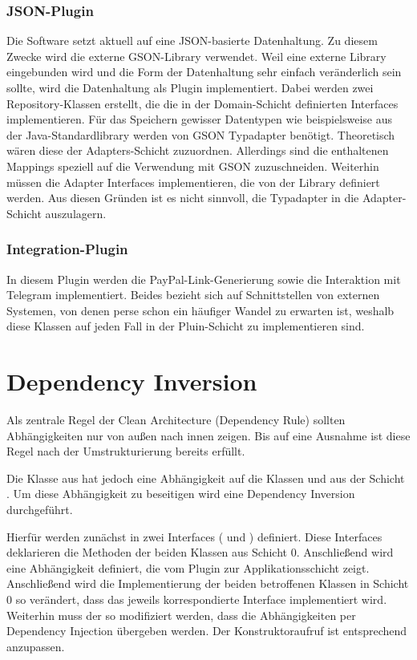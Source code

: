 \subsubsection{JSON-Plugin}
Die Software setzt aktuell auf eine JSON-basierte Datenhaltung.
Zu diesem Zwecke wird die externe GSON-Library verwendet.
Weil eine externe Library eingebunden wird und die Form der Datenhaltung sehr einfach veränderlich sein sollte, wird die Datenhaltung als Plugin implementiert.
Dabei werden zwei Repository-Klassen erstellt, die die in der Domain-Schicht definierten Interfaces implementieren.
Für das Speichern gewisser Datentypen wie beispielsweise  aus der Java-Standardlibrary werden von GSON Typadapter benötigt.
Theoretisch wären diese der Adapters-Schicht zuzuordnen.
Allerdings sind die enthaltenen Mappings speziell auf die Verwendung mit GSON zuzuschneiden.
Weiterhin müssen die Adapter Interfaces implementieren, die von der Library definiert werden.
Aus diesen Gründen ist es nicht sinnvoll, die Typadapter in die Adapter-Schicht auszulagern.

\subsubsection{Integration-Plugin}
In diesem Plugin werden die PayPal-Link-Generierung sowie die Interaktion mit Telegram implementiert.
Beides bezieht sich auf Schnittstellen von externen Systemen, von denen perse schon ein häufiger Wandel zu erwarten ist, weshalb diese Klassen auf jeden Fall in der Pluin-Schicht zu implementieren sind.

\section{Dependency Inversion}
Als zentrale Regel der Clean Architecture (Dependency Rule) sollten Abhängigkeiten nur von außen nach innen zeigen.
Bis auf eine Ausnahme ist diese Regel nach der Umstrukturierung bereits erfüllt.

Die Klasse  aus  hat jedoch eine Abhängigkeit auf die Klassen  und  aus der Schicht .
Um diese Abhängigkeit zu beseitigen wird eine Dependency Inversion durchgeführt.

Hierfür werden zunächst in  zwei Interfaces ( und ) definiert.
Diese Interfaces deklarieren die Methoden der beiden Klassen aus Schicht 0.
Anschließend wird eine Abhängigkeit definiert, die vom Plugin zur Applikationsschicht zeigt.
Anschließend wird die Implementierung der beiden betroffenen Klassen in Schicht 0 so verändert, dass das jeweils korrespondierte Interface implementiert wird.
Weiterhin muss der  so modifiziert werden, dass die Abhängigkeiten per Dependency Injection übergeben werden.
Der Konstruktoraufruf ist entsprechend anzupassen.

